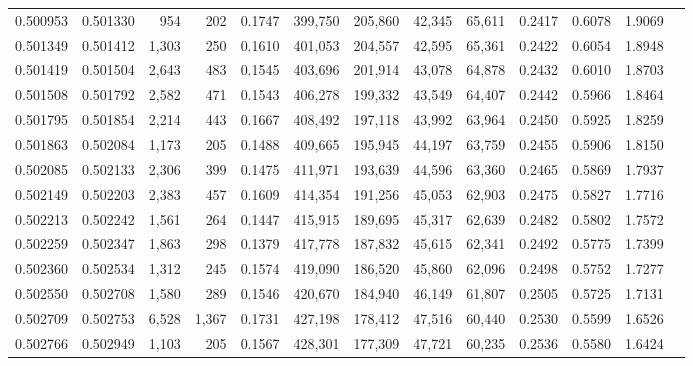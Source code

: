 \begin{tabular}{rrrrrrrrrrrrr}
0.500953 & 0.501330 &   954 &   202 &                                     0.1747 & 399,750 & 205,860 &  42,345 &  65,611 & 0.2417 & 0.6078 & 1.9069 \\
0.501349 & 0.501412 & 1,303 &   250 &                                     0.1610 & 401,053 & 204,557 &  42,595 &  65,361 & 0.2422 & 0.6054 & 1.8948 \\
0.501419 & 0.501504 & 2,643 &   483 &                                     0.1545 & 403,696 & 201,914 &  43,078 &  64,878 & 0.2432 & 0.6010 & 1.8703 \\
0.501508 & 0.501792 & 2,582 &   471 &                                     0.1543 & 406,278 & 199,332 &  43,549 &  64,407 & 0.2442 & 0.5966 & 1.8464 \\
0.501795 & 0.501854 & 2,214 &   443 &                                     0.1667 & 408,492 & 197,118 &  43,992 &  63,964 & 0.2450 & 0.5925 & 1.8259 \\
0.501863 & 0.502084 & 1,173 &   205 &                                     0.1488 & 409,665 & 195,945 &  44,197 &  63,759 & 0.2455 & 0.5906 & 1.8150 \\
0.502085 & 0.502133 & 2,306 &   399 &                                     0.1475 & 411,971 & 193,639 &  44,596 &  63,360 & 0.2465 & 0.5869 & 1.7937 \\
0.502149 & 0.502203 & 2,383 &   457 &                                     0.1609 & 414,354 & 191,256 &  45,053 &  62,903 & 0.2475 & 0.5827 & 1.7716 \\
0.502213 & 0.502242 & 1,561 &   264 &                                     0.1447 & 415,915 & 189,695 &  45,317 &  62,639 & 0.2482 & 0.5802 & 1.7572 \\
0.502259 & 0.502347 & 1,863 &   298 &                                     0.1379 & 417,778 & 187,832 &  45,615 &  62,341 & 0.2492 & 0.5775 & 1.7399 \\
0.502360 & 0.502534 & 1,312 &   245 &                                     0.1574 & 419,090 & 186,520 &  45,860 &  62,096 & 0.2498 & 0.5752 & 1.7277 \\
0.502550 & 0.502708 & 1,580 &   289 &                                     0.1546 & 420,670 & 184,940 &  46,149 &  61,807 & 0.2505 & 0.5725 & 1.7131 \\
0.502709 & 0.502753 & 6,528 & 1,367 &                                     0.1731 & 427,198 & 178,412 &  47,516 &  60,440 & 0.2530 & 0.5599 & 1.6526 \\
0.502766 & 0.502949 & 1,103 &   205 &                                     0.1567 & 428,301 & 177,309 &  47,721 &  60,235 & 0.2536 & 0.5580 & 1.6424 \\

\end{tabular}
